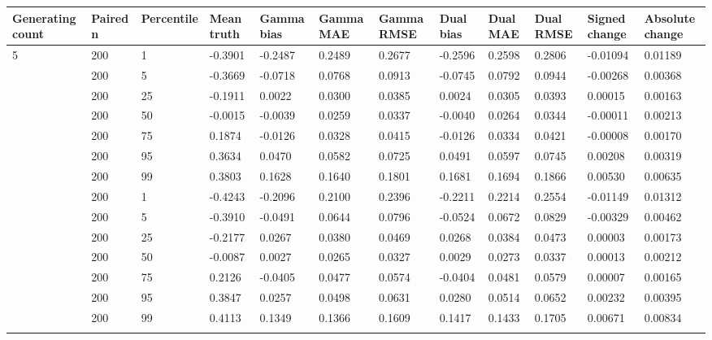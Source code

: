 \begin{longtable}{llllllllllll}
\toprule
Generating count & Paired n & Percentile & Mean truth & Gamma bias & Gamma MAE & Gamma RMSE & Dual bias & Dual MAE & Dual RMSE & Signed change & Absolute change \\
\midrule\endhead
5 & 200 & 1 & -0.3901 & -0.2487 & 0.2489 & 0.2677 & -0.2596 & 0.2598 & 0.2806 & -0.01094 & 0.01189 \\ \addlinespace[3pt]
5 & 200 & 5 & -0.3669 & -0.0718 & 0.0768 & 0.0913 & -0.0745 & 0.0792 & 0.0944 & -0.00268 & 0.00368 \\ \addlinespace[3pt]
5 & 200 & 25 & -0.1911 & 0.0022 & 0.0300 & 0.0385 & 0.0024 & 0.0305 & 0.0393 & 0.00015 & 0.00163 \\ \addlinespace[3pt]
5 & 200 & 50 & -0.0015 & -0.0039 & 0.0259 & 0.0337 & -0.0040 & 0.0264 & 0.0344 & -0.00011 & 0.00213 \\ \addlinespace[3pt]
5 & 200 & 75 & 0.1874 & -0.0126 & 0.0328 & 0.0415 & -0.0126 & 0.0334 & 0.0421 & -0.00008 & 0.00170 \\ \addlinespace[3pt]
5 & 200 & 95 & 0.3634 & 0.0470 & 0.0582 & 0.0725 & 0.0491 & 0.0597 & 0.0745 & 0.00208 & 0.00319 \\ \addlinespace[3pt]
5 & 200 & 99 & 0.3803 & 0.1628 & 0.1640 & 0.1801 & 0.1681 & 0.1694 & 0.1866 & 0.00530 & 0.00635 \\ \addlinespace[3pt]
10 & 200 & 1 & -0.4243 & -0.2096 & 0.2100 & 0.2396 & -0.2211 & 0.2214 & 0.2554 & -0.01149 & 0.01312 \\ \addlinespace[3pt]
10 & 200 & 5 & -0.3910 & -0.0491 & 0.0644 & 0.0796 & -0.0524 & 0.0672 & 0.0829 & -0.00329 & 0.00462 \\ \addlinespace[3pt]
10 & 200 & 25 & -0.2177 & 0.0267 & 0.0380 & 0.0469 & 0.0268 & 0.0384 & 0.0473 & 0.00003 & 0.00173 \\ \addlinespace[3pt]
10 & 200 & 50 & -0.0087 & 0.0027 & 0.0265 & 0.0327 & 0.0029 & 0.0273 & 0.0337 & 0.00013 & 0.00212 \\ \addlinespace[3pt]
10 & 200 & 75 & 0.2126 & -0.0405 & 0.0477 & 0.0574 & -0.0404 & 0.0481 & 0.0579 & 0.00007 & 0.00165 \\ \addlinespace[3pt]
10 & 200 & 95 & 0.3847 & 0.0257 & 0.0498 & 0.0631 & 0.0280 & 0.0514 & 0.0652 & 0.00232 & 0.00395 \\ \addlinespace[3pt]
10 & 200 & 99 & 0.4113 & 0.1349 & 0.1366 & 0.1609 & 0.1417 & 0.1433 & 0.1705 & 0.00671 & 0.00834 \\ \addlinespace[3pt]

\end{longtable}
